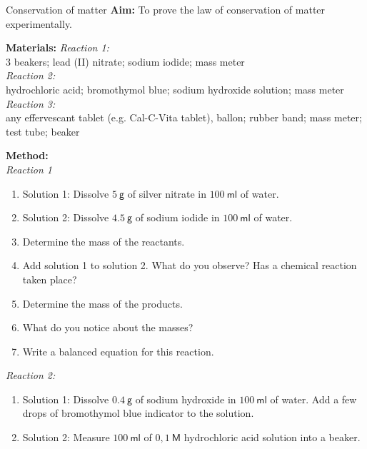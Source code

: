             \begin{i_experiment}{Conservation of matter}
            \nopagebreak
            \label{m38711*eip-453}\noindent{}\textbf{Aim:}
To prove the law of conservation of matter experimentally.
\par 
\label{m38711*eip792}\noindent{}\textbf{Materials:}
\textsl{Reaction 1:} \\
3 beakers; lead (II) nitrate; sodium iodide; mass meter \\
\textsl{Reaction 2:} \\
 hydrochloric acid; bromothymol blue; sodium hydroxide solution; mass meter \\
 \textsl{Reaction 3:} \\
any effervescant tablet (e.g. Cal-C-Vita tablet), ballon; rubber band; mass meter; test tube; beaker
\par 
\label{m38711*eip-153}
	\par
      \label{m38711*id72432}\noindent
\textbf{Method:} \\
\textsl{Reaction 1} \\
\label{m38711*id6342}\begin{enumerate}[noitemsep, label=\textbf{\arabic*}. ] 
            \item Solution 1: Dissolve $5~\mathsf{g}$ of silver nitrate in $100~\mathsf{ml}$ of water.
\item Solution 2: Dissolve $4.5~\mathsf{g}$ of sodium iodide in $100~\mathsf{ml}$ of water.
\item Determine the mass of the reactants.
\item Add solution 1 to solution 2. What do you observe? Has a chemical reaction taken place? 
\item Determine the mass of the products. 
\item What do you notice about the masses?
\item Write a balanced equation for this reaction.
\end{enumerate}
\textsl{Reaction 2:}\\
\label{m38711*id63452}\begin{enumerate}[noitemsep, label=\textbf{\arabic*}. ] 
\item Solution 1: Dissolve $0.4~\mathsf{g}$ of sodium hydroxide in $100~\mathsf{ml}$ of water. Add a few drops of bromothymol blue indicator to the solution. 
\item Solution 2: Measure $100~\mathsf{ml}$ of $0,1~\mathsf{M}$ hydrochloric acid solution into a beaker.

\end{enumerate}
\end{i_experiment}
